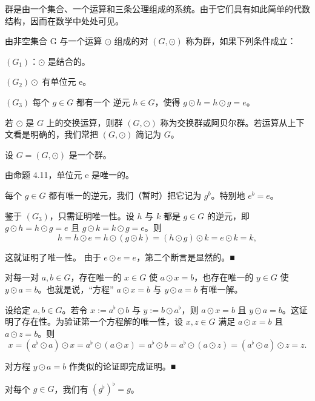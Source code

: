群是由一个集合、一个运算和三条公理组成的系统。由于它们具有如此简单的代数结构，因而在数学中处处可见。

由非空集合 G 与一个运算 $ \odot $ 组成的对 $ (G,\odot) $ 称为群，如果下列条件成立：

$ (G_1) $：$ \odot $ 是结合的。

$ (G_{2}) \odot $ 有单位元 e。

$ (G_3) $ 每个 $ g \in G $ 都有一个 $ \mathbf{逆元} $ $ h \in G $，使得 $ g \odot h = h \odot g = e $。

若 $ \odot $ 是 $ G $ 上的交换运算，则群 $ (G, \odot) $ 称为交换群或阿贝尔群。若运算从上下文看是明确的，我们常把 $ (G, \odot) $ 简记为 $ G $。

\begin{remark}

设 $  G = (G, \odot)  $ 是一个群。

\begin{items}
\item

由命题 4.11，单位元 e 是唯一的。

\item

每个 $ g \in G $ 都有唯一的逆元，我们（暂时）把它记为 $ g^b $。特别地 $ e^b = e $。

\proofhead
鉴于 $(G_3)$，只需证明唯一性。设 $h$ 与 $k$ 都是 $g \in G$ 的逆元，即 $g \odot h = h \odot g = e$ 且 $g \odot k = k \odot g = e$。则
\[
h=h\odot e=h\odot(g\odot k)=(h\odot g)\odot k=e\odot k=k,
\]

这就证明了唯一性。
由于 $ e \odot e = e $，第二个断言是显然的。■

\item

对每一对 $a,b\in G$，存在唯一的 $x\in G$ 使 $a\odot x=b$，也存在唯一的 $y\in G$ 使 $y\odot a=b$。也就是说，“方程” $a\odot x=b$ 与 $y\odot a=b$ 有唯一解。

\proofhead
设给定 $a, b \in G$。若令 $x := a^{\flat} \odot b$ 与 $y := b \odot a^{\flat}$，则 $a \odot x = b$ 且 $y \odot a = b$。这证明了存在性。为验证第一个方程解的唯一性，设 $x, z \in G$ 满足 $a \odot x = b$ 且 $a \odot z = b$。则
\[
x=(a^{\flat}\odot a)\odot x=a^{\flat}\odot(a\odot x)=a^{\flat}\odot b=a^{\flat}\odot(a\odot z)=(a^{\flat}\odot a)\odot z=z.
\]

对方程 $ y\odot a=b $ 作类似的论证即完成证明。■

\item

对每个 $ g \in G $，我们有 $ (g^{\flat})^{\flat} = g $。


\end{items}
\end{remark}
